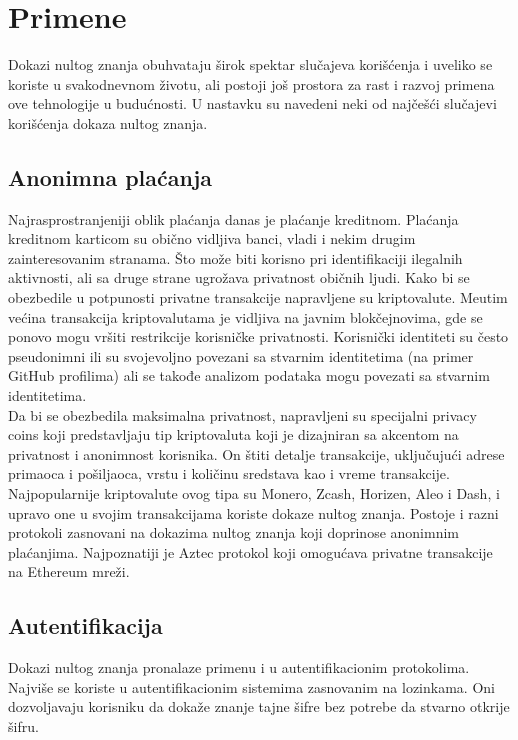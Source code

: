 \chapter{Primene}
Dokazi nultog znanja obuhvataju \v sirok spektar slu\v cajeva kori\v s\' cenja i uveliko se koriste u svakodnevnom životu, ali postoji još prostora za rast i razvoj primena ove tehnologije u budu\' cnosti. U nastavku su navedeni neki od naj\v ce\v s\' ci slu\v cajevi kori\v s\' cenja dokaza nultog znanja.

\section{Anonimna pla\' canja}
 Najrasprostranjeniji oblik plaćanja danas je plaćanje kreditnom. Plaćanja kreditnom karticom su obi\v cno vidljiva banci, vladi i nekim drugim zainteresovanim stranama. Što mo\v ze biti korisno pri identifikaciji ilegalnih aktivnosti, ali sa druge strane ugro\v zava privatnost obi\v cnih ljudi. Kako bi se obezbedile u potpunosti privatne transakcije napravljene su kriptovalute. Me\dj utim ve\' cina transakcija kriptovalutama je vidljiva na javnim blokčejnovima, gde se ponovo mogu vršiti restrikcije korisničke privatnosti. Korisni\v cki identiteti su \v cesto pseudonimni ili su svojevoljno povezani sa stvarnim identitetima (na primer \textenglish{GitHub} profilima) ali se takođe analizom podataka mogu povezati sa stvarnim identitetima.\\

Da bi se obezbedila maksimalna privatnost, napravljeni su specijalni \textenglish{privacy coins} koji predstavljaju tip kriptovaluta koji je  dizajniran sa akcentom na privatnost i anonimnost korisnika. On \v stiti detalje transakcije, uklju\v cuju\' ci adrese primaoca i po\v siljaoca, vrstu i koli\v cinu sredstava kao i vreme transakcije. Najpopularnije kriptovalute ovog tipa su \textenglish{Monero}\cite{monero}, \textenglish{Zcash, Horizen}\cite{horizen}, \textenglish{Aleo}\cite{aleo} i \textenglish{Dash}\cite{Duffield2017DashAP}, i upravo one u svojim transakcijama koriste dokaze nultog znanja. Postoje i razni protokoli zasnovani na dokazima nultog znanja koji doprinose anonimnim plaćanjima. Najpoznatiji je \textenglish{Aztec} protokol\cite{aztec} koji omogućava privatne transakcije na \textenglish{Ethereum} mreži.

\section{Autentifikacija}
Dokazi nultog znanja pronalaze primenu i u autentifikacionim protokolima. Najvi\v se se koriste u autentifikacionim sistemima zasnovanim na lozinkama. Oni dozvoljavaju korisniku da doka\v ze znanje tajne \v sifre bez potrebe da stvarno otkrije \v sifru.\\

